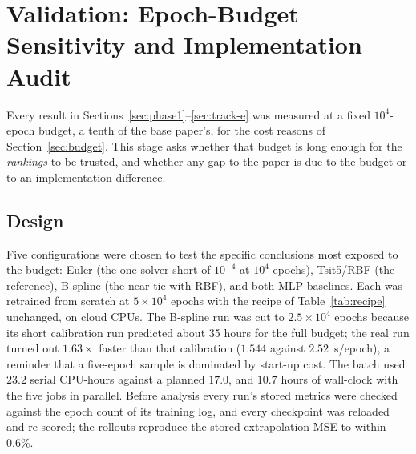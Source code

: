 \section{Validation: Epoch-Budget Sensitivity and Implementation Audit}
\label{sec:phase4}

Every result in Sections~\ref{sec:phase1}--\ref{sec:track-e} was measured at
a fixed $10^4$-epoch budget, a tenth of the base paper's, for the cost reasons
of Section~\ref{sec:budget}. This stage asks whether that budget is long
enough for the \emph{rankings} to be trusted, and whether any gap to the
paper is due to the budget or to an implementation difference.

\begin{expectbox}
\end{expectbox}

\subsection{Design}

Five configurations were chosen to test the specific conclusions most
exposed to the budget: Euler (the one solver short of $10^{-4}$ at $10^4$
epochs), Tsit5/RBF (the reference), B-spline (the near-tie with RBF), and both
MLP baselines. Each was retrained from scratch at $5\times10^4$ epochs with the
recipe of Table~\ref{tab:recipe} unchanged, on cloud CPUs. The B-spline run
was cut to $2.5\times10^4$ epochs because its short calibration run
predicted about 35 hours for the full budget; the real run turned out
$1.63\times$ faster than that calibration ($1.544$ against $2.52$~s/epoch),
a reminder that a five-epoch sample is dominated by start-up cost. The batch
used $23.2$ serial CPU-hours against a planned $17.0$, and $10.7$ hours of
wall-clock with the five jobs in parallel. Before analysis every
run's stored metrics were checked against the epoch count of its training
log, and every checkpoint was reloaded and re-scored; the rollouts
reproduce the stored extrapolation MSE to within $0.6\%$.

